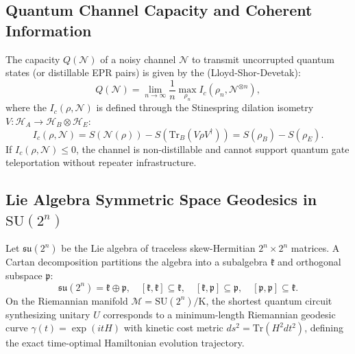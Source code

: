 \subsection{Quantum Channel Capacity and Coherent Information}
The capacity $Q(\mathcal{N})$ of a noisy channel $\mathcal{N}$ to transmit uncorrupted quantum states (or distillable EPR pairs) is given by the  (Lloyd-Shor-Devetak):
\begin{equation}
    Q(\mathcal{N}) = \lim_{n \to \infty} \frac{1}{n} \max_{\rho_n} I_c\left(\rho_n, \mathcal{N}^{\otimes n}\right),
\end{equation}
where the  $I_c(\rho, \mathcal{N})$ is defined through the Stinespring dilation isometry $V: \mathcal{H}_A \to \mathcal{H}_B \otimes \mathcal{H}_E$:
\begin{equation}
    I_c(\rho, \mathcal{N}) = S(\mathcal{N}(\rho)) - S\left(\text{Tr}_B\left( V \rho V^\dagger \right)\right) = S(\rho_B) - S(\rho_E).
    \label{eq:coherent_information_def}
\end{equation}
If $I_c(\rho, \mathcal{N}) \le 0$, the channel is non-distillable and cannot support quantum gate teleportation without repeater infrastructure.

\subsection{Lie Algebra Symmetric Space Geodesics in $\mathrm{SU}(2^n)$}
Let $\mathfrak{su}(2^n)$ be the Lie algebra of traceless skew-Hermitian $2^n \times 2^n$ matrices. A Cartan decomposition partitions the algebra into a subalgebra $\mathfrak{k}$ and orthogonal subspace $\mathfrak{p}$:
\begin{equation}
    \mathfrak{su}(2^n) = \mathfrak{k} \oplus \mathfrak{p}, \quad [\mathfrak{k}, \mathfrak{k}] \subseteq \mathfrak{k}, \quad [\mathfrak{k}, \mathfrak{p}] \subseteq \mathfrak{p}, \quad [\mathfrak{p}, \mathfrak{p}] \subseteq \mathfrak{k}.
\end{equation}
On the Riemannian manifold $\mathcal{M} = \mathrm{SU}(2^n) / \mathrm{K}$, the shortest quantum circuit synthesizing unitary $U$ corresponds to a minimum-length Riemannian geodesic curve $\gamma(t) = \exp(i t H)$ with kinetic cost metric $ds^2 = \text{Tr}(H^2 dt^2)$, defining the exact time-optimal Hamiltonian evolution trajectory.
